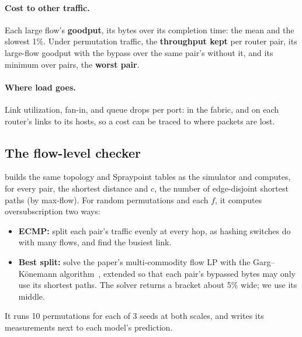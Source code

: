 \paragraph{Cost to other traffic.} Each large flow's \textbf{goodput}, its bytes over its completion time: the mean and the slowest 1\%. Under permutation traffic, the \textbf{throughput kept} per router pair, its large-flow goodput with the bypass over the same pair's without it, and its minimum over pairs, the \textbf{worst pair}.

\paragraph{Where load goes.} Link utilization, fan-in, and queue drops per port: in the fabric, and on each router's links to its hosts, so a cost can be traced to where packets are lost.

\subsection{The flow-level checker}
\label{sec:checker}

 builds the same topology and Spraypoint tables as the simulator and computes, for every pair, the shortest distance and $c$, the number of edge-disjoint shortest paths (by max-flow). For random permutations and each $f$, it computes oversubscription two ways:
\begin{itemize}
  \item \textbf{ECMP:} split each pair's traffic evenly at every hop, as hashing switches do with many flows, and find the busiest link.
  \item \textbf{Best split:} solve the paper's multi-commodity flow LP with the Garg--K\"onemann algorithm~\cite{gargkonemann}, extended so that each pair's bypassed bytes may only use its shortest paths. The solver returns a bracket about 5\% wide; we use its middle.
\end{itemize}
It runs 10 permutations for each of 3 seeds at both scales, and writes its measurements next to each model's prediction.
